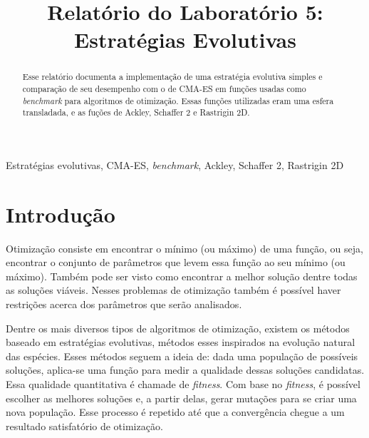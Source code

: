 \documentclass[conference]{IEEEtran}
\begin{document}
\title{Relatório do Laboratório 5: \\ Estratégias Evolutivas\\
}

\author{
}

\maketitle

\begin{abstract}
Esse relatório documenta a implementação de uma estratégia evolutiva simples e comparação de seu desempenho com o de CMA-ES em funções usadas como \textit{benchmark} para algoritmos de otimização. Essas funções utilizadas eram uma esfera transladada, e as fuções de Ackley, Schaffer 2 e Rastrigin 2D.
\end{abstract}

\begin{IEEEkeywords}
Estratégias evolutivas, CMA-ES, \textit{benchmark}, Ackley, Schaffer 2, Rastrigin 2D
\end{IEEEkeywords}

\section{Introdução}
Otimização consiste em encontrar o mínimo (ou máximo) de uma função, ou seja, encontrar o conjunto de parâmetros que levem essa função ao seu mínimo (ou máximo). Também pode ser visto como encontrar a melhor solução dentre todas as soluções viáveis. Nesses problemas de otimização também é possível haver restrições acerca dos parâmetros que serão analisados.

Dentre os mais diversos tipos de algoritmos de otimização, existem os métodos baseado em estratégias evolutivas, métodos esses inspirados na evolução natural das espécies. Esses métodos seguem a ideia de: dada uma população de possíveis soluções, aplica-se uma função para medir a qualidade dessas soluções candidatas. Essa qualidade quantitativa é chamade de \textit{fitness}. Com base no \textit{fitness}, é possível escolher as melhores soluções e, a partir delas, gerar mutações para se criar uma nova população. Esse processo é repetido até que a convergência chegue a um resultado satisfatório de otimização.
\end{document}
